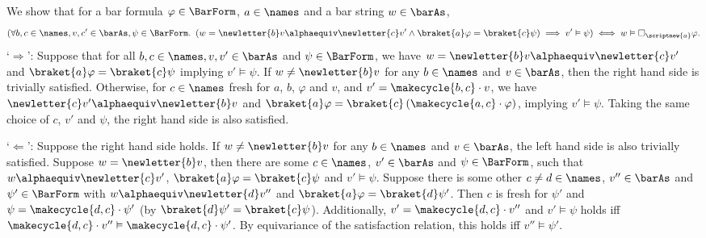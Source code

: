 \documentclass[10pt, final, conference, a4paper, twocolumn]{IEEEtran}
\renewcommand{\enquote}[1]{`#1'}
\begin{document}
\begin{IEEEproof}
  We show that for a bar formula $\varphi \in \BarForm$, $a \in \names$ and
  a bar string $w \in \barAs$,
  \[ 
    \left(\forall b, c \in \names, v, c' \in \barAs, \psi \in \BarForm.\ \left(w = \newletter{b}v \alphaequiv \newletter{c}v' \wedge \braket{a}\varphi = \braket{c}\psi\right) \implies v' \vDash \psi\right) \iff w \vDash \Box_{\scriptnew{a}} \varphi.
  \]
  \enquote{$\Rightarrow$}: Suppose that for all $b, c \in \names, v, v' \in \barAs$ and $\psi \in \BarForm$, we have
  $w = \newletter{b}v \alphaequiv \newletter{c}v'$ and $\braket{a}\varphi = \braket{c}\psi$
  implying $v' \vDash \psi$. If $w \neq \newletter{b}v$ for any $b \in \names$ and $v \in \barAs$, then the right hand
  side is trivially satisfied. Otherwise, for $c \in \names$ fresh for $a$, $b$, $\varphi$ and $v$, and
  $v' = \makecycle{b,c} \cdot v$, we have $\newletter{c}v' \alphaequiv \newletter{b}v$ and $\braket{a}\varphi =
  \braket{c}\left(\makecycle{a,c} \cdot \varphi\right)$, implying $v' \vDash \psi$. Taking the same choice of
  $c$, $v'$ and $\psi$, the right hand side is also satisfied.

  \noindent\enquote{$\Leftarrow$}: Suppose the right hand side holds. If $w \neq \newletter{b}v$ for any $b \in \names$
  and $v \in \barAs$, the left hand side is also trivially satisfied. Suppose $w = \newletter{b}v$, then
  there are some $c \in \names$, $v' \in \barAs$ and $\psi \in \BarForm$, such that $w \alphaequiv \newletter{c}v'$,
  $\braket{a}\varphi = \braket{c}\psi$ and $v' \vDash \psi$. Suppose there is some other $c \neq d \in \names$,
  $v'' \in \barAs$ and $\psi' \in \BarForm$ with $w \alphaequiv \newletter{d}v''$ and $\braket{a}\varphi =
  \braket{d}\psi'$.
  Then $c$ is fresh for $\psi'$ and $\psi = \makecycle{d,c} \cdot \psi'$ (by $\braket{d}\psi' = \braket{c}\psi$). 
  Additionally, $v' = \makecycle{d,c} \cdot v''$ and $v' \vDash \psi$ holds iff $\makecycle{d,c}\cdot v'' \vDash
  \makecycle{d,c} \cdot \psi'$. By equivariance of the satisfaction relation, this holds iff $v'' \vDash \psi'$.
\end{IEEEproof}
\end{document}
